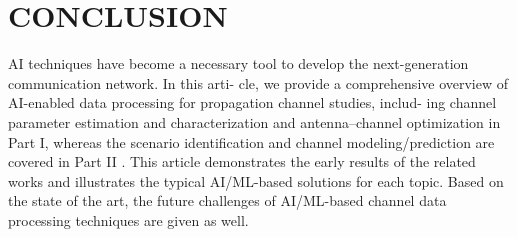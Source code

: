 \documentclass[conference]{IEEEtran}
\begin{document}
\section{CONCLUSION}
AI techniques have become a necessary tool to develop
the next-generation communication network. In this arti-
cle, we provide a comprehensive overview of AI-enabled
data processing for propagation channel studies, includ-
ing channel parameter estimation and characterization and
antenna–channel optimization in Part I, whereas the scenario
identification and channel modeling/prediction are covered
in Part II . This article demonstrates the early results
of the related works and illustrates the typical AI/ML-based
solutions for each topic. Based on the state of the art, the
future challenges of AI/ML-based channel data processing
techniques are given as well.



\end{document}
